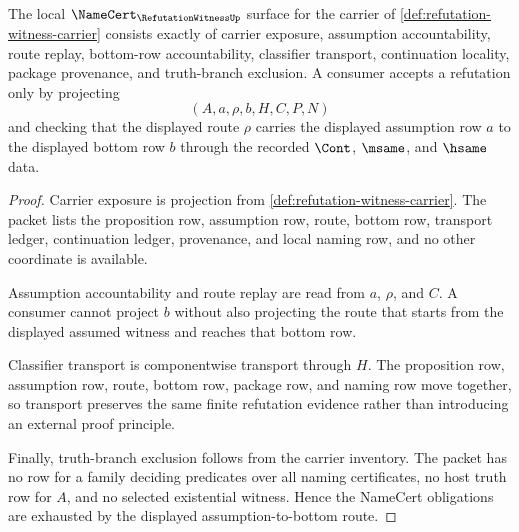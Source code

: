 \begin{theorem}
\label{thm:refutation-witness-namecert-obligations}
The local $\NameCert_{\RefutationWitnessUp}$ surface for the carrier of \autoref{def:refutation-witness-carrier} consists exactly of carrier exposure, assumption accountability, route replay, bottom-row accountability, classifier transport, continuation locality, package provenance, and truth-branch exclusion. A consumer accepts a refutation only by projecting
$$
(A,a,\rho,b,H,C,P,N)
$$
and checking that the displayed route $\rho$ carries the displayed assumption row $a$ to the displayed bottom row $b$ through the recorded $\Cont$, $\msame$, and $\hsame$ data.
\end{theorem}
\begin{proof}
Carrier exposure is projection from \autoref{def:refutation-witness-carrier}. The packet lists the proposition row, assumption row, route, bottom row, transport ledger, continuation ledger, provenance, and local naming row, and no other coordinate is available.

Assumption accountability and route replay are read from $a$, $\rho$, and $C$. A consumer cannot project $b$ without also projecting the route that starts from the displayed assumed witness and reaches that bottom row.

Classifier transport is componentwise transport through $H$. The proposition row, assumption row, route, bottom row, package row, and naming row move together, so transport preserves the same finite refutation evidence rather than introducing an external proof principle.

Finally, truth-branch exclusion follows from the carrier inventory. The packet has no row for a family deciding predicates over all naming certificates, no host truth row for $A$, and no selected existential witness. Hence the NameCert obligations are exhausted by the displayed assumption-to-bottom route.
\end{proof}

